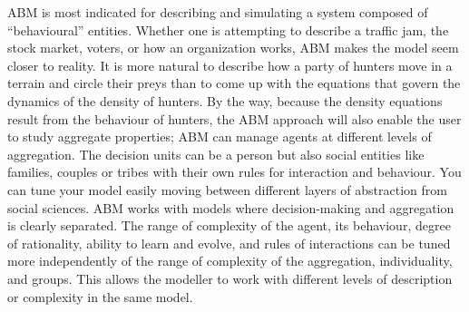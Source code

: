 \documentclass[11pt,oneside,a4paper,openright]{report}
\begin{document}
ABM is most indicated for describing and simulating a system composed of “behavioural” entities. Whether one is attempting to describe a traffic jam, the stock market, voters, or how an organization works, ABM makes the model seem closer to reality. It is more natural to describe how a party of hunters move in a terrain and circle their preys than to come up with the equations that govern the dynamics of the density of hunters. By the way, because the density equations result from the behaviour of hunters, the ABM approach will also enable the user to study aggregate properties\cite[p.2]{Bonabeau2002}; ABM can manage agents at different levels of aggregation. The decision units can be a person but also social entities like families, couples or tribes with their own rules for interaction and behaviour. You can tune your model easily moving between different layers of abstraction from social sciences. ABM works with models where decision-making and aggregation is clearly separated. The range of complexity of the agent, its behaviour, degree of rationality, ability to learn and evolve, and rules of interactions can be tuned more independently of the range of complexity of the aggregation, individuality, and groups. This allows the modeller to work with different levels of description or complexity in the same model\cite[p.2]{Bonabeau2002}.
\end{document}
